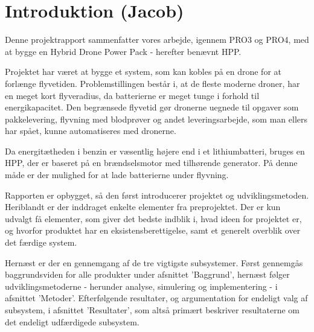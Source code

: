 \fancyhf{}
\fancyhead[LE,RO]{\leftmark}
\fancyhead[RE,LO]{\rightmark}

\chapter{Introduktion (Jacob)}
\label{sec:introduktion-1}

Denne projektrapport sammenfatter vores arbejde, igennem PRO3 og PRO4, med at bygge en Hybrid Drone Power Pack - herefter benævnt HPP.

Projektet har været at bygge et system, som kan kobles på en drone for at forlænge flyvetiden. Problemstillingen består i, at de fleste moderne droner, har en meget kort flyveradius, da batterierne er meget tunge i forhold til energikapacitet. Den begrænsede flyvetid gør dronerne uegnede til opgaver som pakkelevering, flyvning med blodprøver og andet leveringsarbejde, som man ellers har spået, kunne automatiseres med dronerne.

Da energitætheden i benzin er væsentlig højere end i et lithiumbatteri, bruges en HPP, der er baseret på en brændselsmotor med tilhørende generator. På denne måde er der  mulighed for at lade batterierne under flyvning.

Rapporten er opbygget, så den først introducerer projektet og udviklingsmetoden. Heriblandt er der inddraget enkelte elementer fra preprojektet. Der er kun udvalgt få elementer, som giver det bedste indblik i, hvad ideen for projektet er, og hvorfor produktet har en eksistensberettigelse, samt et generelt overblik over det færdige system. 

Hernæst er der en gennemgang af de tre vigtigste subsystemer. Først gennemgås baggrundsviden for alle produkter under afsnittet ’Baggrund’, hernæst følger udviklingsmetoderne - herunder analyse, simulering og implementering - i afsnittet ’Metoder’. Efterfølgende resultater, og argumentation for endeligt valg af subsystem, i afsnittet ’Resultater’, som altså primært beskriver resultaterne om det endeligt udfærdigede subsystem. 


